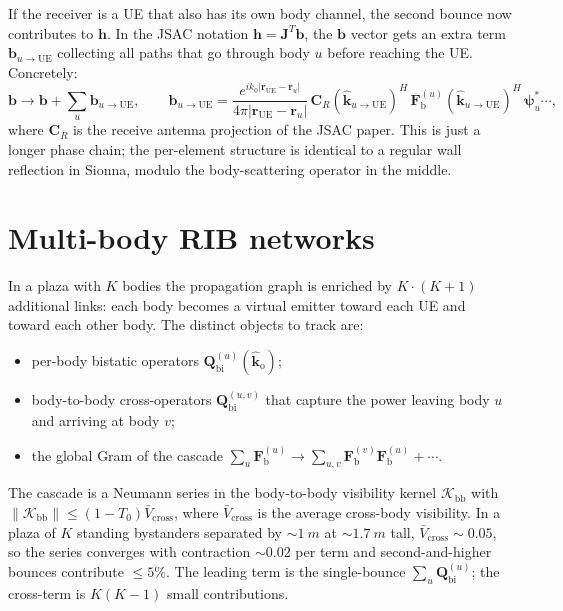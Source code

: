 \documentclass[11pt,a4paper]{article}
\theoremstyle{definition}
\newcommand{\rr}{\mathbf{r}}
\newcommand{\kout}{\hat{\bm{k}}_{\mathrm{o}}}
\newcommand{\Frib}{\mathbf{F}_{\mathrm{b}}}
\newcommand{\Qbist}{\mathbf{Q}_{\mathrm{bi}}}
\newcommand{\hh}{\mathbf{h}}
\newcommand{\Jmat}{\mathbf{J}}
\newcommand{\bvec}{\mathbf{b}}
\begin{document}
If the receiver is a UE that also has its own body channel, the second
bounce now contributes to $\hh$.  In the JSAC notation
$\hh=\Jmat^T\bvec$, the $\bvec$ vector gets an extra term
$\bvec_{u\to\mathrm{UE}}$ collecting all paths that go through body
$u$ before reaching the UE.  Concretely:
\begin{equation}\label{eq:bvec-rib}
  \bvec\to \bvec + \sum_{u} \bvec_{u\to\mathrm{UE}},
  \qquad
  \bvec_{u\to\mathrm{UE}}=
  \frac{e^{ik_0|\rr_{\mathrm{UE}}-\rr_u|}}{4\pi|\rr_{\mathrm{UE}}-\rr_u|}\,
  \mathbf{C}_R(\hat{\bm{k}}_{u\to\mathrm{UE}})^{\!H}\,\Frib^{(u)}(\hat{\bm{k}}_{u\to\mathrm{UE}})^{\!H}\,
  \bm\psi_{u}^{\!*}\cdots,
\end{equation}
where $\mathbf{C}_R$ is the receive antenna projection of the
JSAC paper.  This is just a longer phase chain; the per-element
structure is identical to a regular wall reflection in Sionna, modulo
the body-scattering operator in the middle.

\section{Multi-body RIB networks}\label{sec:multi}

In a plaza with $K$ bodies the propagation graph is enriched by
$K\cdot(K+1)$ additional links: each body becomes a virtual emitter
toward each UE and toward each other body.  The distinct objects to
track are:

\begin{itemize}[leftmargin=1.6em,itemsep=2pt]
\item per-body bistatic operators $\Qbist^{(u)}(\kout)$;
\item body-to-body cross-operators $\Qbist^{(u,v)}$ that capture the
power leaving body $u$ and arriving at body $v$;
\item the global Gram of the cascade
$\sum_u\Frib^{(u)}\to\sum_{u,v}\Frib^{(v)}\Frib^{(u)}+\cdots$.
\end{itemize}

The cascade is a Neumann series in the body-to-body visibility kernel
$\mathcal{K}_{\mathrm{bb}}$ with $\|\mathcal{K}_{\mathrm{bb}}\|\le
(1-T_0)\bar V_{\mathrm{cross}}$, where $\bar V_{\mathrm{cross}}$ is
the average cross-body visibility.  In a plaza of $K$ standing
bystanders separated by $\sim\SI{1}{m}$ at $\sim\SI{1.7}{m}$ tall,
$\bar V_{\mathrm{cross}}\sim 0.05$, so the series converges with
contraction $\sim 0.02$ per term and second-and-higher bounces
contribute $\le 5\%$.  The leading term is the single-bounce
$\sum_u\Qbist^{(u)}$; the cross-term is $K(K-1)$ small contributions.
\end{document}
